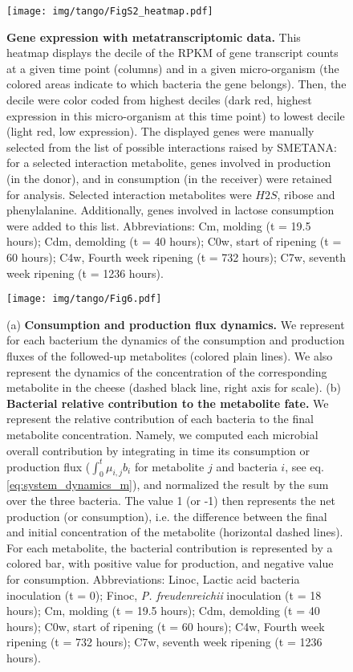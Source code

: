 \documentclass[../main.tex]{subfiles}
\begin{document}
\begin{figure}[htpb!]
    \centering
    \texttt{[image: img/tango/FigS2\_heatmap.pdf]}
    \caption{\textbf{Gene expression with metatranscriptomic data.} This heatmap displays the decile of the RPKM of gene transcript counts at a given time point (columns) and in a given micro-organism (the colored areas indicate to which bacteria the gene belongs). Then, the decile were color coded from highest deciles (dark red, highest expression in this micro-organism at this time point) to lowest decile (light red, low expression). The displayed genes were manually selected from the list of possible interactions raised by SMETANA: for a selected interaction metabolite, genes involved in production (in the donor), and in consumption (in the receiver) were retained for analysis. Selected interaction metabolites were $H2S$, ribose and phenylalanine. Additionally, genes involved in lactose consumption were added to this list. Abbreviations: Cm, molding (t = 19.5 hours); Cdm, demolding (t = 40 hours); C0w, start of ripening (t = 60 hours); C4w, Fourth week ripening (t = 732 hours); C7w, seventh week ripening (t = 1236 hours). }
    \label{fig:heatmap_metaT}
\end{figure}


\begin{figure}[htp!]  
    \centering
        \texttt{[image: img/tango/Fig6.pdf]}
        \caption{(a) \textbf{Consumption and production flux dynamics.} We represent for each bacterium the dynamics of the consumption and production fluxes of the followed-up metabolites (colored plain lines). We also represent the dynamics of the concentration of the corresponding metabolite in the cheese (dashed black line, right axis for scale). (b) \textbf{Bacterial relative contribution to the metabolite fate.} We represent the relative contribution of each bacteria to the final metabolite concentration. Namely, we computed each microbial overall contribution by integrating in time its consumption or production flux ($\int_0^t \mu_{i,j} b_i$ for metabolite $j$ and bacteria $i$, see eq.\ref{eq:system_dynamics_m}), and normalized the result by the sum over the three bacteria. The value 1 (or -1) then represents the net production (or consumption), i.e. the difference between the final and initial concentration of the metabolite (horizontal dashed lines). For each metabolite, the bacterial contribution is represented by a colored bar, with positive value for production, and negative value for consumption. Abbreviations: Linoc, Lactic acid bacteria inoculation (t = 0); Finoc, \textit{P. freudenreichii} inoculation (t = 18 hours); Cm, molding (t = 19.5 hours); Cdm, demolding (t = 40 hours); C0w, start of ripening (t = 60 hours); C4w, Fourth week ripening (t = 732 hours); C7w, seventh week ripening (t = 1236 hours).}
        \label{fig:flux-contrib}
    \end{figure}
    
\end{document}
